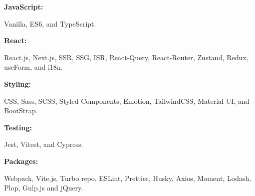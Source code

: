 \documentclass[8pt]{developercv} %
\begin{document}
    \begin{minipage}[t]{0.47\textwidth}
        \vspace{-6pt}

        \begin{minipage}[t]{0.14\textwidth}
            \textbf{JavaScript:}
        \end{minipage}
        \hfill
        \begin{minipage}[t]{0.79\textwidth}
            Vanilla, ES6, and TypeScript.
        \end{minipage}
        \vspace{4pt}

        \begin{minipage}[t]{0.14\textwidth}
            \textbf{React:}
        \end{minipage}
        \hfill
        \begin{minipage}[t]{0.79\textwidth}
            React.js, Next.js, SSR, SSG, ISR, React-Query, React-Router, Zustand, Redux, useForm, and i18n.
        \end{minipage}
        \vspace{4pt}

        \begin{minipage}[t]{0.14\textwidth}
            \textbf{Styling:}
        \end{minipage}
        \hfill
        \begin{minipage}[t]{0.79\textwidth}
            CSS, Sass, SCSS, Styled-Components, Emotion, TailwindCSS, Material-UI, and BootStrap.
        \end{minipage}
        \vspace{4pt}

        \begin{minipage}[t]{0.14\textwidth}
            \textbf{Testing:}
        \end{minipage}
        \hfill
        \begin{minipage}[t]{0.79\textwidth}
            Jest, Vitest, and Cypress.
        \end{minipage}
        \vspace{4pt}

        \begin{minipage}[t]{0.14\textwidth}
            \textbf{Packages:}
        \end{minipage}
        \hfill
        \begin{minipage}[t]{0.79\textwidth}
            Webpack, Vite.js, Turbo repo, ESLint, Prettier, Husky, Axios, Moment, Lodash, Plop, Gulp.js and jQuery.
        \end{minipage}
        \vspace{4pt}


\end{minipage}
\end{document}
